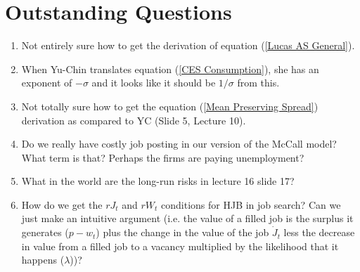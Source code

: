 \documentclass[12pt]{article}
\begin{document}
\section{Outstanding Questions}

\begin{enumerate}
    \item Not entirely sure how to get the derivation of equation (\ref{Lucas AS General}).
    \item When Yu-Chin translates equation (\ref{CES Consumption}), she has an exponent of $-\sigma$ and it looks like it should be $1/\sigma$ from this.
    \item Not totally sure how to get the equation (\ref{Mean Preserving Spread}) derivation as compared to YC (Slide 5, Lecture 10).
    \item Do we really have costly job posting in our version of the McCall model? What term is that? Perhaps the firms are paying unemployment?
    \item What in the world are the long-run risks in lecture 16 slide 17?
    \item How do we get the $rJ_t$ and $rW_t$ conditions for HJB in job search? Can we just make an intuitive argument (i.e. the value of a filled job is the surplus it generates ($p-w_t$) plus the change in the value of the job $\dot{J}_t$ less the decrease in value from a filled job to a vacancy multiplied by the likelihood that it happens ($\lambda$))?
\end{enumerate}
\end{document}
